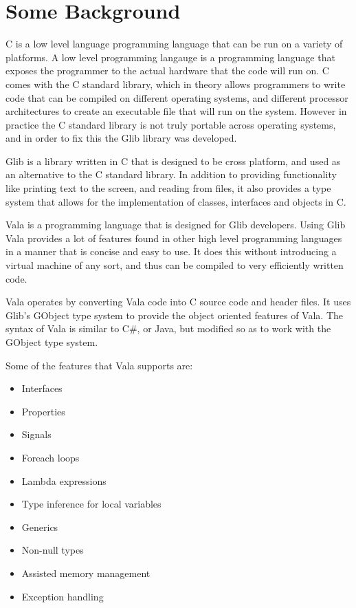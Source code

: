 \chapter{Some Background}

C is a low level language programming language that can be run on a variety of platforms. A low level programming langauge is a programming language that exposes the programmer to the actual hardware that the code will run on. C comes with the C standard library, which in theory allows programmers to write code that can be compiled on different operating systems, and different processor architectures to create an executable file that will run on the system. However in practice the C standard library is not truly portable across operating systems, and in order to fix this the Glib library was developed.

Glib is a library written in C that is designed to be cross platform, and used as an alternative to the C standard library. In addition to providing functionality like printing text to the screen, and reading from files, it also provides a type system that allows for the implementation of classes, interfaces and objects in C.

Vala is a programming language that is designed for Glib developers. Using Glib Vala provides a lot of features found in other high level programming languages in a manner that is concise and easy to use. It does this without introducing a virtual machine of any sort, and thus can be compiled to very efficiently written code.

Vala operates by converting Vala code into C source code and header files. It uses Glib's GObject type system to provide the object oriented features of Vala. The syntax of Vala is similar to C\#, or Java, but modified so as to work with the GObject type system.

Some of the features that Vala supports are:

\begin{itemize}
	\item Interfaces
	\item Properties
	\item Signals
	\item Foreach loops
	\item Lambda expressions
	\item Type inference for local variables
	\item Generics
	\item Non-null types
	\item Assisted memory management
	\item Exception handling
\end{itemize}

